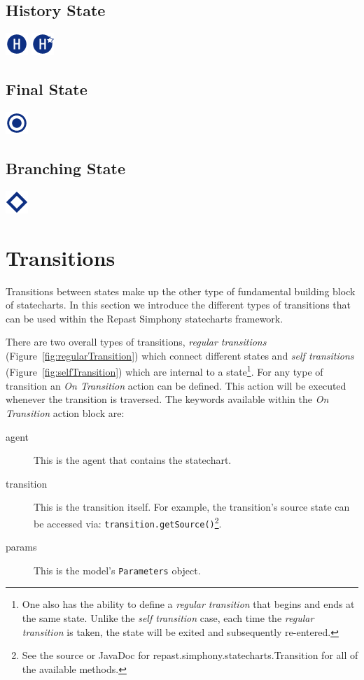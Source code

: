 \documentclass[11pt]{amsart}
\begin{document}
\subsection{History State}
\label{sec:historyState}
\includegraphics[height=.2in]{StatechartsImages/Shallow-History-32.png} \includegraphics[height=.2in]{StatechartsImages/Deep-History-32.png}

\subsection{Final State}
\label{sec:finalState}
\includegraphics[height=.2in]{StatechartsImages/Final-State-32.png}

\subsection{Branching State}
\label{sec:branchingState}
\includegraphics[height=.2in]{StatechartsImages/Choice-32.png}

\section{Transitions}

Transitions between states make up the other type of fundamental building block of statecharts. In this section we introduce the different types of transitions that can be used within the Repast Simphony statecharts framework.

There are two overall types of transitions, \emph{regular transitions} (Figure~\ref{fig:regularTransition}) which connect different states and \emph{self transitions} (Figure~\ref{fig:selfTransition}) which are internal to a state\footnote{One also has the ability to define a \emph{regular transition} that begins and ends at the same state. Unlike the \emph{self transition} case, each time the \emph{regular transition} is taken, the state will be exited and subsequently re-entered.}. For any type of transition an \emph{On Transition} action can be defined. This action will be executed whenever the transition is traversed. The keywords available within the \emph{On Transition} action block are:
\begin{description}
\item[agent] This is the agent that contains the statechart.
\item[transition] This is the transition itself. For example, the transition's source state can be accessed via: \texttt{transition.getSource()}\footnote{See the source or JavaDoc for repast.simphony.statecharts.Transition for all of the available methods.}.
\item[params] This is the model's \texttt{Parameters} object.
\end{description}
\end{document}
